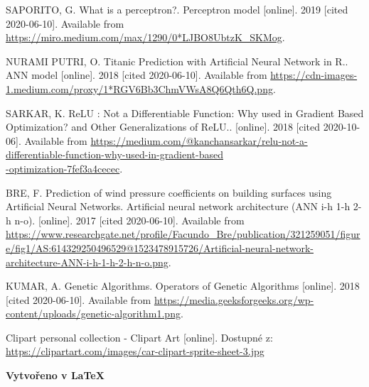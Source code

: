 \documentclass[a4paper,12pt]{article}
\begin{document}
    \bigskip
    \tableofcontents
    \listoffigures

    \begin{thebibliography}{6}
            SAPORITO, G. What is a perceptron?. Perceptron model [online]. 2019 [cited 2020-06-10]. 
            Available from \url{https://miro.medium.com/max/1290/0*LJBO8UbtzK_SKMog}.

            NURAMI PUTRI, O. Titanic Prediction with Artificial Neural Network in R.. ANN model 
            [online]. 2018 [cited 2020-06-10]. Available from \url{https://cdn-images-1.medium.com/proxy/1*RGV6Bb3ChmVWsA8Q6Qth6Q.png}.

            SARKAR, K. ReLU : Not a Differentiable Function: 
            Why used in Gradient Based Optimization? and Other Generalizations of ReLU.. [online]. 
            2018 [cited 2020-10-06]. Available from \url{https://medium.com/@kanchansarkar/relu-not-a-differentiable-function-why-used-in-gradient-based}\\\url{-optimization-7fef3a4cecec}.

            BRE, F. Prediction of wind pressure coefficients on building surfaces using 
            Artificial Neural Networks. Artificial neural network architecture (ANN i-h 1-h 2-h n-o). 
            [online]. 2017 [cited 2020-06-10]. Available from \url{https://www.researchgate.net/profile/Facundo_Bre/publication/321259051/figure/fig1/AS:614329250496529@1523478915726/Artificial-neural-network-architecture-ANN-i-h-1-h-2-h-n-o.png}.

            KUMAR, A. Genetic Algorithms. Operators of Genetic Algorithms [online]. 2018 
            [cited 2020-06-10]. Available from \url{https://media.geeksforgeeks.org/wp-content/uploads/genetic-algorithm1.png}.

            Clipart personal collection - Clipart Art [online]. 
            Dostupné z: \url{https://clipartart.com/images/car-clipart-sprite-sheet-3.jpg}

    \end{thebibliography}

    \vspace{0.75em}
    \begin{center}
        \footnotesize{
            \textbf{Vytvořeno v \LaTeX}
        }
    \end{center}
\end{document}

